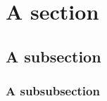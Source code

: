 \documentclass[10pt,twoside,fleqn,french,english]{actuecon}
\author{First Author}
\affil{First Author's Affiliation}
\author{Second Author}
\affil{Second Author's Affiliation}
\date{} %
\begin{document}
	
	\setcounter{page}{3}
	
	\maketitle
	\thispagestyle{empty}			
	
	\begin{AEresume}
	\end{AEresume}

	\begin{AEabstract}
	\end{AEabstract}

	\AEintroduction
	
		       	
	\AEsectionsDeveloppement
	
		\section{A section}
						
		\subsection{A subsection}
								 
		\subsubsection{A subsubsection}
				
	\AEconclusion
	
							
	\AEbibliographie
	
	
		
\end{document}
